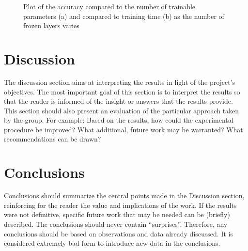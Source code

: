 \begin{figure}
    \centering
    \caption{Plot of the accuracy compared to the number of trainable parameters (a) and compared to training time (b) as the number of frozen layers varies}
    \label{fig:time_acc}
\end{figure}




\section{Discussion}
The discussion section aims at interpreting the results in light of the project's objectives. The most important goal of this section is to interpret the results so that the reader is informed of the insight or answers that the results provide. This section should also present an evaluation of the particular approach taken by the group. For example: Based on the results, how could the experimental procedure be improved? What additional, future work may be warranted? What recommendations can be drawn?


\section{Conclusions}
Conclusions should summarize the central points made in the Discussion section, reinforcing for the reader the value and implications of the work. If the results were not definitive, specific future work that may be needed can be (briefly) described. The conclusions should never contain ``surprises''. Therefore, any conclusions should be based on observations and data already discussed. It is considered extremely bad form to introduce new data in the conclusions.




